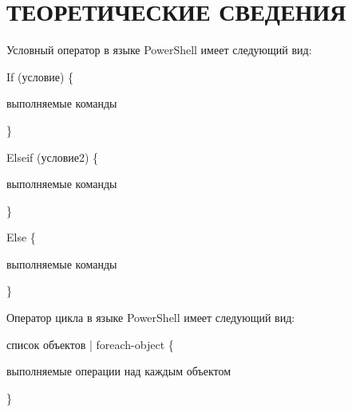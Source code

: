 \section{ТЕОРЕТИЧЕСКИЕ СВЕДЕНИЯ}

Условный оператор в языке PowerShell имеет следующий вид:

If (условие) \{

\hspace{7mm} выполняемые команды

\}

Elseif (условие2) \{

\hspace{7mm} выполняемые команды

\}

Else \{

\hspace{7mm} выполняемые команды

\}

Оператор цикла в языке PowerShell имеет следующий вид:

список объектов | foreach-object \{

\hspace{7mm} выполняемые операции над каждым объектом

\}

\newpage
